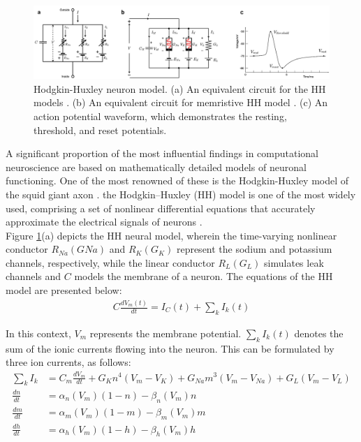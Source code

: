 \begin{figure}[htbp!] 
    \centering    
    \includegraphics[width=1\textwidth]{Chapter2/Figs/c.png}
    \caption[Hodgkin-Huxley neuron model.]{Hodgkin-Huxley neuron model. (a) An equivalent circuit for the HH models \cite{hodgkin1952quantitative}. (b) An equivalent circuit for memristive HH model \cite{chua2012hodgkin}. (c) An action potential waveform, which demonstrates the resting, threshold, and reset potentials. }
    \label{fig:2c}
\end{figure}

\noindent A significant proportion of the most influential findings in computational neuroscience are based on mathematically detailed models of neuronal functioning. One of the most renowned of these is the Hodgkin-Huxley model of the squid giant axon \cite{hodgkin1952quantitative}. the Hodgkin–Huxley (HH) model is one of the most widely used, comprising a set of nonlinear differential equations that accurately approximate the electrical signals of neurons \cite{chua2012hodgkin}. \\

\noindent Figure \ref{fig:2c}(a) depicts the HH neural model, wherein the time-varying nonlinear conductor $R_{Na}(GNa)$ and $R_K(G_K)$ represent the sodium and potassium channels, respectively, while the linear conductor $R_L(G_L)$ simulates leak channels and $C$ models the membrane of a neuron. The equations of the HH model are presented below: 
\begin{align}
    C \frac{dV_m(t)}{dt} = I_C(t) + \sum_{k}^{}I_k(t) \label{eq:2.1} 
\end{align}

\noindent In this context, $V_m$ represents the membrane potential. $\sum_{k}^{}I_k(t)$ denotes the sum of the ionic currents flowing into the neuron. This can be formulated by three ion currents, as follows:
\begin{align}
    \sum_{k}^{}I_k &= C_m \frac{dV_m}{dt} + G_Kn^4(V_m - V_K) + G_{Na}m^3(V_m - V_{Na}) + G_L (V_m - V_L) \label{eq:2.2} \\
    \frac{dn}{dt} &= \alpha_n(V_m)(1-n)-\beta_n(V_m)n \label{eq:2.3} \\
    \frac{dm}{dt} &= \alpha_m(V_m)(1-m) - \beta_m(V_m)m \label{eq:2.4} \\
    \frac{dh}{dt} &= \alpha_h(V_m)(1-h)-\beta_h(V_m)h \label{eq:2.5}
\end{align}

